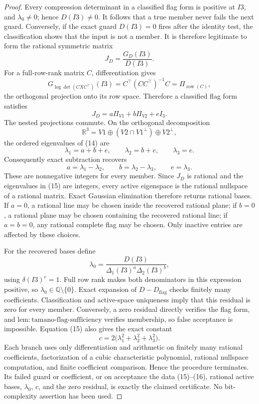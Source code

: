 \documentclass{article}
\begin{document}
\begin{proof}
Every compression determinant in a classified flag form is positive at
\(I3\), and \(\lambda_0\neq0\); hence \(D(I3)\neq0\).  It follows that
a true member never fails the next guard.  Conversely, if the exact
guard \(D(I3)=0\) fires after the identity test, the classification
shows that the input is not a member.  It is therefore legitimate to
form the rational symmetric matrix
\[
 J_D=\frac{G_D(I3)}{D(I3)}.
\]
For a full-row-rank matrix \(C\), differentiation gives
\[
 G_{\log\det(CXC^{\top})}(I3)
 =C^{\top}(CC^{\top})^{-1}C
 =\Pi_{\operatorname{row}(C)},                                      \tag{13}
\]
the orthogonal projection onto its row space.  Therefore a classified
flag form satisfies
\[
 J_D=a\Pi_{V1}+b\Pi_{V2}+eI_3.                                      \tag{14}
\]
The nested projections commute.  On the orthogonal decomposition
\[
 \mathbb R^3
 =V1\oplus(V2\cap V1^{\perp})\oplus V2^{\perp},
\]
the ordered eigenvalues of (14) are
\[
 \lambda_1=a+b+e,
 \qquad \lambda_2=b+e,
 \qquad \lambda_3=e.                                                \tag{15}
\]
Consequently exact subtraction recovers
\[
 a=\lambda_1-\lambda_2,
 \qquad b=\lambda_2-\lambda_3,
 \qquad e=\lambda_3.                                                \tag{16}
\]
These are nonnegative integers for every member.  Since \(J_D\) is
rational and the eigenvalues in (15) are integers, every active
eigenspace is the rational nullspace of a rational matrix.  Exact
Gaussian elimination therefore returns rational bases.  If \(a=0\), a
rational line may be chosen inside the recovered rational plane; if
\(b=0\), a rational plane may be chosen containing the recovered
rational line; if \(a=b=0\), any rational complete flag may be chosen.
Only inactive entries are affected by these choices.

For the recovered bases define
\[
 \lambda_0
 =\frac{D(I3)}{\Delta_1(I3)^a\Delta_2(I3)^b},
\]
using \(\delta(I3)^e=1\).  Full row rank makes both denominators in
this expression positive, so \(\lambda_0\in\mathbb Q\setminus\{0\}\).
Exact expansion of \(D-D_{\mathrm{flag}}\) checks finitely many
coefficients.  Classification and active-space uniqueness imply that
this residual is zero for every member.  Conversely, a zero residual
directly verifies the flag form, and
\(\mathrm{lem{:}tamano\text{-}flag\text{-}sufficiency}\) verifies
membership, so false acceptance is impossible.  Equation (15) also
gives the exact constant
\[
 c=2\bigl(\lambda_1^2+\lambda_2^2+\lambda_3^2\bigr).
\]
Each branch uses only differentiation and arithmetic on finitely many
rational coefficients, factorization of a cubic characteristic
polynomial, rational nullspace computation, and finite coefficient
comparison.  Hence the procedure terminates.  Its failed guard or
coefficient, or on acceptance the data (15)--(16), rational active
bases, \(\lambda_0\), \(c\), and the zero residual, is exactly the
claimed certificate.  No bit-complexity assertion has been used.
\end{proof}
\end{document}
